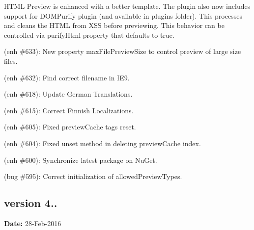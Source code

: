 \begin{DoxyItemize}
\begin{DoxyItemize}
\item H\+T\+ML Preview is enhanced with a better template. The plugin also now includes support for {\ttfamily D\+O\+M\+Purify} plugin (and available in plugins folder). This processes and cleans the H\+T\+ML from X\+SS before previewing. This behavior can be controlled via {\ttfamily purify\+Html} property that defaults to {\ttfamily true}.
\end{DoxyItemize}
\item (enh \#633)\+: New property {\ttfamily max\+File\+Preview\+Size} to control preview of large size files.
\item (enh \#632)\+: Find correct filename in I\+E9.
\item (enh \#618)\+: Update German Translations.
\item (enh \#615)\+: Correct Finnish Localizations.
\item (enh \#605)\+: Fixed preview\+Cache tags reset.
\item (enh \#604)\+: Fixed unset method in deleting preview\+Cache index.
\item (enh \#600)\+: Synchronize latest package on Nu\+Get.
\item (bug \#595)\+: Correct initialization of {\ttfamily allowed\+Preview\+Types}.
\end{DoxyItemize}

\subsection*{version 4..}

{\bfseries Date\+:} 28-\/\+Feb-\/2016


